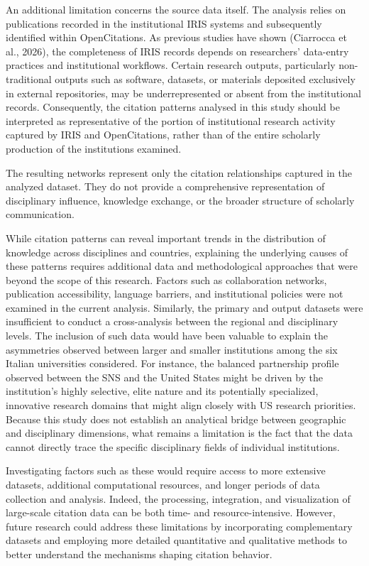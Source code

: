 \documentclass[year=2026]{cup-journal}
\begin{document}
An additional limitation concerns the source data itself. The analysis relies on publications recorded in the institutional IRIS systems and subsequently identified within OpenCitations. As previous studies have shown (Ciarrocca et al., 2026), the completeness of IRIS records depends on researchers' data-entry practices and institutional workflows. Certain research outputs, particularly non-traditional outputs such as software, datasets, or materials deposited exclusively in external repositories, may be underrepresented or absent from the institutional records. Consequently, the citation patterns analysed in this study should be interpreted as representative of the portion of institutional research activity captured by IRIS and OpenCitations, rather than of the entire scholarly production of the institutions examined.

The resulting networks represent only the citation relationships captured in the analyzed dataset. They do not provide a comprehensive representation of disciplinary influence, knowledge exchange, or the broader structure of scholarly communication.

While citation patterns can reveal important trends in the distribution of knowledge across disciplines and countries, explaining the underlying causes of these patterns requires additional data and methodological approaches that were beyond the scope of this research. Factors such as collaboration networks, publication accessibility, language barriers, and institutional policies were not examined in the current analysis. Similarly, the primary and output datasets were insufficient to conduct a cross-analysis between the regional and disciplinary levels. The inclusion of such data would have been valuable to explain the asymmetries observed between larger and smaller institutions among the six Italian universities considered. For instance, the balanced partnership profile observed between the SNS and the United States might be driven by the institution's highly selective, elite nature and its potentially specialized, innovative research domains that might align closely with US research priorities. Because this study does not establish an analytical bridge between geographic and disciplinary dimensions, what remains a limitation is the fact that the data cannot directly trace the specific disciplinary fields of individual institutions.

Investigating factors such as these would require access to more extensive datasets, additional computational resources, and longer periods of data collection and analysis. Indeed, the processing, integration, and visualization of large-scale citation data can be both time- and resource-intensive. However, future research could address these limitations by incorporating complementary datasets and employing more detailed quantitative and qualitative methods to better understand the mechanisms shaping citation behavior.
\end{document}
